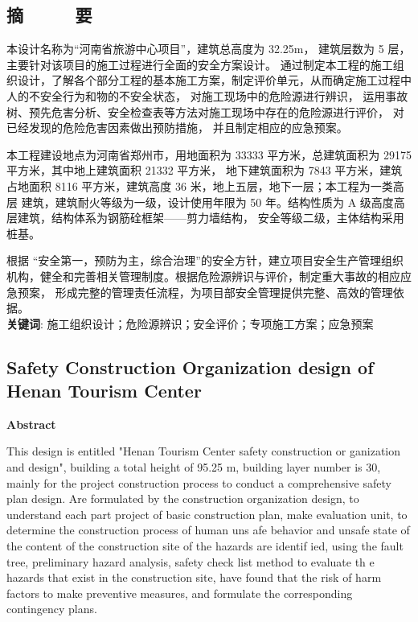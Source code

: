 \begin{center}
\section*{  \textbf{摘 ~~~~ 要}}
\end{center}

\thispagestyle{plain}

\vskip0.5cm
\setlength{\baselineskip}{20pt}

本设计名称为“河南省旅游中心项目”，建筑总高度为 32.25m， 建筑层数为 5  层，主要针对该项目的施工过程进行全面的安全方案设计。
通过制定本工程的施工组织设计，了解各个部分工程的基本施工方案，制定评价单元，从而确定施工过程中人的不安全行为和物的不安全状态，
对施工现场中的危险源进行辨识， 运用事故树、预先危害分析、安全检查表等方法对施工现场中存在的危险源进行评价， 对已经发现的危险危害因素做出预防措施，
并且制定相应的应急预案。

本工程建设地点为河南省郑州市，用地面积为 33333 平方米，总建筑面积为 29175 平方米，其中地上建筑面积 21332 平方米，
地下建筑面积为 7843 平方米，建筑占地面积 8116 平方米，建筑高度 36 米，地上五层，地下一层；本工程为一类高层
建筑，建筑耐火等级为一级，设计使用年限为 50 年。结构性质为 A 级高度高层建筑，结构体系为钢筋硂框架——剪力墙结构，
安全等级二级，主体结构采用桩基。

根据 “安全第一，预防为主，综合治理”的安全方针，建立项目安全生产管理组织机构，健全和完善相关管理制度。根据危险源辨识与评价，制定重大事故的相应应急预案，
形成完整的管理责任流程，为项目部安全管理提供完整、高效的管理依据。\\



{ \heiti \textbf{关键词}:  \zhongsong 施工组织设计；危险源辨识；安全评价；专项施工方案；应急预案}

\clearpage


\clearpage
\begin{center}
    \section*{  \textbf{Safety Construction Organization design of Henan Tourism Center}}
     \textbf{Abstract}
    \end{center}


   This design is entitled "Henan Tourism Center safety construction or ganization and design", building a total height of 95.25 m, building layer number is 30, 
   mainly for the project construction process to conduct a comprehensive safety plan design. Are formulated by the construction organization design, 
   to understand each part project of basic construction plan, make evaluation unit, to determine the construction process of human uns afe behavior 
   and unsafe state of the content of the construction site of the hazards are identif ied, using the fault tree, preliminary hazard analysis, safety 
   check list method to evaluate th e hazards that exist in the construction site, have found that the risk of harm factors to make preventive measures,
    and formulate the corresponding contingency plans.

